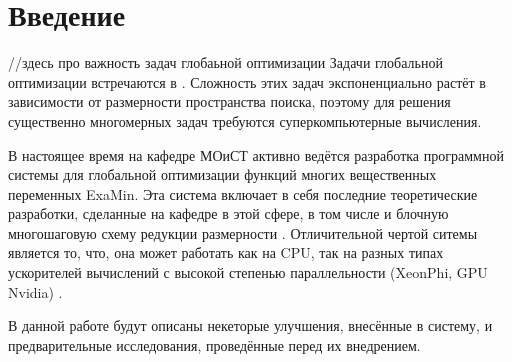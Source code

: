 \section{Введение}
//здесь про важность задач глобаьной оптимизации
Задачи глобальной оптимизации встречаются в . Сложность этих задач экспоненциально растёт в зависимости от размерности пространства поиска, поэтому для решения существенно многомерных задач требуются
суперкомпьютерные вычисления.
\par
В настоящее время на кафедре МОиСТ активно ведётся разработка программной системы для глобальной оптимизации функций многих вещественных переменных ExaMin.
Эта система включает в себя последние теоретические разработки, сделанные на кафедре в этой сфере, в том числе и блочную многошаговую схему редукции размерности \cite{blockNested}.
Отличительной чертой ситемы является то, что, она может работать как на CPU, так на разных типах ускорителей вычислений с высокой степенью параллельности (XeonPhi, GPU Nvidia) \cite{examinArtcle, examinPhiArtcle}.
\par
В данной работе будут описаны некеторые улучшения, внесённые в систему, и предварительные исследования, проведённые перед их внедрением.
